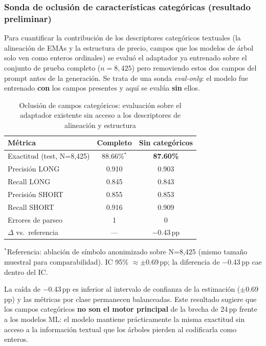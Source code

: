 \documentclass[10pt,twocolumn]{article}
\begin{document}
\subsubsection{Sonda de oclusi\'on de caracter\'isticas categ\'oricas (resultado preliminar)}
\label{sec:ablation-occlusion}

Para cuantificar la contribuci\'on de los descriptores categ\'oricos textuales (la alineaci\'on de EMAs y la estructura de precio, campos que los modelos de \'arbol solo ven como enteros ordinales) se evalu\'o el adaptador ya entrenado sobre el conjunto de prueba completo ($n=8{,}425$) pero removiendo estos dos campos del prompt antes de la generaci\'on. Se trata de una sonda \textit{eval-only}: el modelo fue entrenado \textbf{con} los campos presentes y aqu\'i se eval\'ua \textbf{sin} ellos.

\begin{table}[H]
\centering
\caption{Oclusi\'on de campos categ\'oricos: evaluaci\'on sobre el adaptador existente sin acceso a los descriptores de alineaci\'on y estructura}
\label{tab:ablation-occlusion}
\footnotesize
\begin{tabularx}{\columnwidth}{Xcc}
\toprule
\textbf{M\'etrica} & \textbf{Completo} & \textbf{Sin categ\'oricos} \\
\midrule
Exactitud (test, N=8,425) & 88.66\%$^*$ & \textbf{87.60\%} \\
Precisi\'on LONG & 0.910 & 0.903 \\
Recall LONG & 0.845 & 0.843 \\
Precisi\'on SHORT & 0.855 & 0.853 \\
Recall SHORT & 0.916 & 0.909 \\
Errores de parseo & 1 & 0 \\
$\Delta$ vs.\ referencia & --- & $-$0.43\,pp \\
\bottomrule
\end{tabularx}
{\scriptsize $^*$Referencia: ablaci\'on de s\'imbolo anonimizado sobre N=8,425 (mismo tama\~no muestral para comparabilidad). IC 95\% $\approx \pm$0.69\,pp; la diferencia de $-$0.43\,pp cae dentro del IC.}
\end{table}

La ca\'ida de $-$0.43\,pp es inferior al intervalo de confianza de la estimaci\'on ($\pm$0.69\,pp) y las m\'etricas por clase permanecen balanceadas. Este resultado sugiere que los campos categ\'oricos \textbf{no son el motor principal} de la brecha de 24\,pp frente a los modelos ML: el modelo mantiene pr\'acticamente la misma exactitud sin acceso a la informaci\'on textual que los \'arboles pierden al codificarla como enteros.
\end{document}
